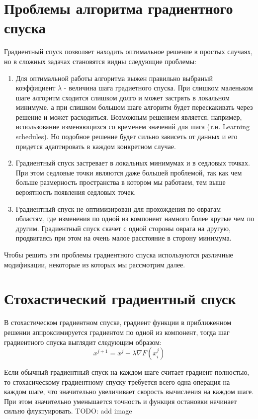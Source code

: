 \documentclass[12pt]{report}
\begin{document}
  \section{Проблемы алгоритма градиентного спуска}
  Градиентный спуск позволяет находить оптимальное решение в простых случаях, но
  в сложных задачах становятся видны следующие проблемы:
  \begin{enumerate}
    \item
    Для оптимальной работы алгоритма выжен правильно выбраный коэффициент $\lambda$
    - величина шага градиетного спуска. При слишком маленьком шаге алгоритм
    сходится слишком долго и может застрять в локальном минимуме, а при слишком
    большом шаге алгоритм будет перескакивать через решение и может расходиться.
    Возможным решением является, например, использование изменяющихся со временем
    значений для шага (т.н. Learning schedules). Но подобное решение будет
    сильно зависеть от данных и его придется адаптировать в каждом конкретном случае.
    \item
    Градиентный спуск застревает в локальных минимумах и в седловых точках.
    При этом седловые точки являются даже большей проблемой, так как чем больше
    размерность пространства в котором мы работаем, тем выше вероятность
    появления седловых точек.
    \item
    Градиентный спуск не оптимизирован для прохождения по оврагам - областям, где
    изменения по одной из компонент намного более крутые чем по другим.
    Градиентный спуск скачет с одной стороны оврага на другую, продвигаясь при
    этом на очень малое расстояние в сторону минимума.
  \end{enumerate}
  Чтобы решить эти проблемы градиентного спуска используются различные модификации,
  некоторые из которых мы рассмотрим далее.

  \section{Стохастический градиентный спуск}
    В стохастическом градиентном спуске, градиент функции в приближенном решении
    аппроксимируется градиентом по одной из компонент, тогда шаг градиентного
    спуска выглядит следующим образом:
    \begin{equation}
      x^{j+1}=x^j- \lambda \nabla F(x^j_i)
    \end{equation}

    Если обычный градиентный спуск на каждом шаге считает градиент полностью, то
    стохасическому градиентному спуску требуется всего одна операция на каждом
    шаге, что значительно увеличивает скорость вычисления на каждом шаге. При
    этом значительно уменьшается точность и функция остановки начинает сильно
    флуктуировать. {TODO: add image}
\end{document}

